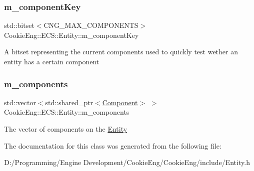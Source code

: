\subsubsection{\texorpdfstring{m\+\_\+component\+Key}{m\_componentKey}}
{\footnotesize\ttfamily std\+::bitset$<$C\+N\+G\+\_\+\+M\+A\+X\+\_\+\+C\+O\+M\+P\+O\+N\+E\+N\+TS$>$ Cookie\+Eng\+::\+E\+C\+S\+::\+Entity\+::m\+\_\+component\+Key\hspace{0.3cm}{\ttfamily [protected]}}

A bitset representing the current components used to quickly test wether an entity has a certain component \mbox{\label{class_cookie_eng_1_1_e_c_s_1_1_entity_a5c8b8b6f07c07b97e898ece5dab38517}} 
\subsubsection{\texorpdfstring{m\+\_\+components}{m\_components}}
{\footnotesize\ttfamily std\+::vector$<$std\+::shared\+\_\+ptr$<$\hyperlink{class_cookie_eng_1_1_e_c_s_1_1_component}{Component}$>$ $>$ Cookie\+Eng\+::\+E\+C\+S\+::\+Entity\+::m\+\_\+components\hspace{0.3cm}{\ttfamily [protected]}}

The vector of components on the \hyperlink{class_cookie_eng_1_1_e_c_s_1_1_entity}{Entity} 

The documentation for this class was generated from the following file\+:\begin{DoxyCompactItemize}
\item 
D\+:/\+Programming/\+Engine Development/\+Cookie\+Eng/\+Cookie\+Eng/include/Entity.\+h\end{DoxyCompactItemize}
